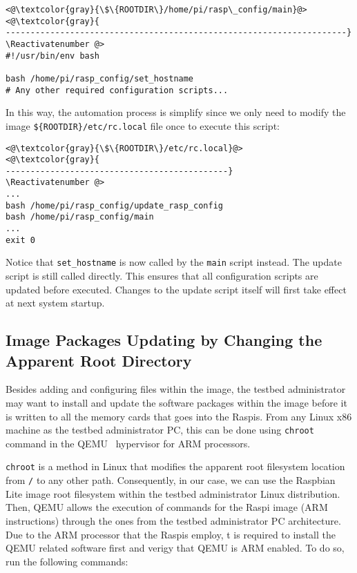 \Suppressnumber\begin{lstlisting}[]
<@\textcolor{gray}{\$\{ROOTDIR\}/home/pi/rasp\_config/main}@>
<@\textcolor{gray}{
---------------------------------------------------------------------}
\Reactivatenumber @>
#!/usr/bin/env bash

bash /home/pi/rasp_config/set_hostname
# Any other required configuration scripts...
\end{lstlisting}
\FloatBarrier
\vspace{-5mm}

In this way, the automation process is simplify since we only need to modify
the image \texttt{\$\{ROOTDIR\}/etc/rc.local} file once to execute this script:

\Suppressnumber\begin{lstlisting}[]
<@\textcolor{gray}{\$\{ROOTDIR\}/etc/rc.local}@>
<@\textcolor{gray}{
---------------------------------------------}
\Reactivatenumber @>
...
bash /home/pi/rasp_config/update_rasp_config
bash /home/pi/rasp_config/main
...
exit 0
\end{lstlisting}
\FloatBarrier
\vspace{-5mm}

Notice that \texttt{set\_hostname} is now called by the \texttt{main}
script instead. The update script is still called directly. This ensures that
all configuration scripts are updated before executed. Changes to the update
script itself will first take effect at next system startup.

\subsection{Image Packages Updating by Changing the Apparent Root Directory}
Besides adding and configuring files within the image, the testbed
administrator may want to install and update the software packages
within the image before it is written to all the memory cards that goes
into the \ac{Raspi}s. From any Linux x86 machine as the testbed administrator
\ac{PC}, this can be done using \texttt{chroot} command in the
QEMU~\cite{QemuUserEmulation} hypervisor for \ac{ARM} processors.

\texttt{chroot} is a method in Linux that modifies the apparent root
filesystem location from \texttt{/} to any other path. Consequently, in
our case, we can use the Raspbian Lite image root filesystem within the
testbed administrator Linux distribution. Then, QEMU allows the execution
of commands for the \ac{Raspi} image (\ac{ARM} instructions) through the ones
from the testbed administrator \ac{PC} architecture. Due to the \ac{ARM}
processor that the \ac{Raspi}s employ, t is required to install the QEMU related software first and verigy that QEMU is \ac{ARM} enabled. To do so,
run the following commands:

